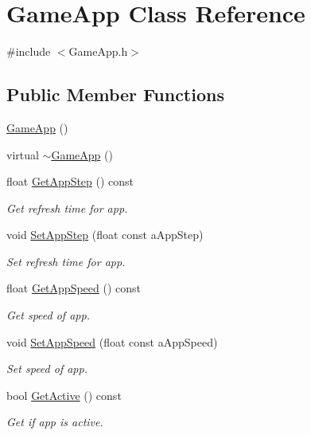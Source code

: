 \hypertarget{classGameApp}{}\section{Game\+App Class Reference}
\label{classGameApp}


{\ttfamily \#include $<$Game\+App.\+h$>$}

\subsection*{Public Member Functions}
\begin{DoxyCompactItemize}
\item 
\hyperlink{classGameApp_a60fa14c5e72ac86d85257732494210ce}{Game\+App} ()
\item 
virtual \hyperlink{classGameApp_ae23ced12f4a79184b3719b3905c58170}{$\sim$\+Game\+App} ()
\item 
float \hyperlink{classGameApp_ae7921d33aa0f1a8ca6ffb1bd8e2090ab}{Get\+App\+Step} () const 
\begin{DoxyCompactList}\small\item\em Get refresh time for app. \end{DoxyCompactList}\item 
void \hyperlink{classGameApp_ad2b4b7e8bb12b5f8736d78ff3698b913}{Set\+App\+Step} (float const a\+App\+Step)
\begin{DoxyCompactList}\small\item\em Set refresh time for app. \end{DoxyCompactList}\item 
float \hyperlink{classGameApp_a76e72ba141cd96cd84e56d65a0ee007f}{Get\+App\+Speed} () const 
\begin{DoxyCompactList}\small\item\em Get speed of app. \end{DoxyCompactList}\item 
void \hyperlink{classGameApp_ad475a1923e4a450e2a292b1f7eff85f0}{Set\+App\+Speed} (float const a\+App\+Speed)
\begin{DoxyCompactList}\small\item\em Set speed of app. \end{DoxyCompactList}\item 
bool \hyperlink{classGameApp_a008397467507c441e2ff4be6164dfb15}{Get\+Active} () const 
\begin{DoxyCompactList}\small\item\em Get if app is active. \end{DoxyCompactList}\item 

\end{DoxyCompactItemize}

